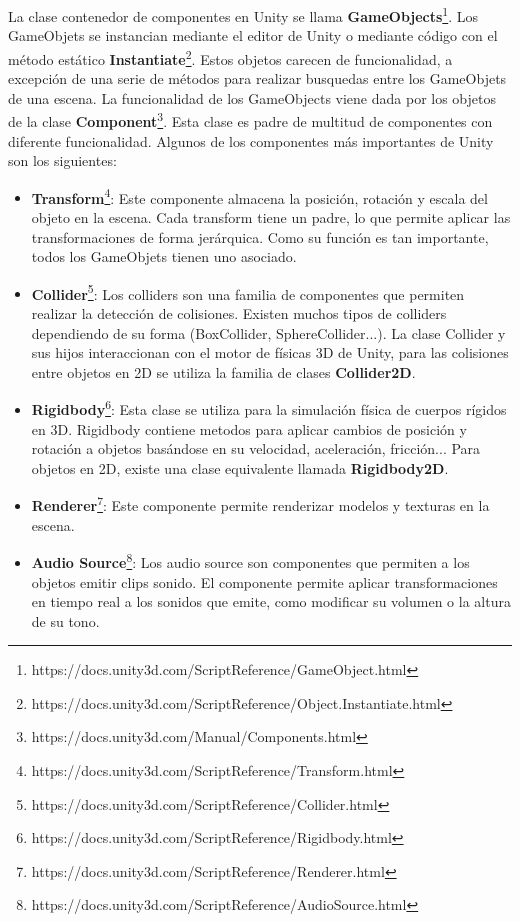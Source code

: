 La clase contenedor de componentes en Unity se llama \textbf{GameObjects}\footnote{https://docs.unity3d.com/ScriptReference/GameObject.html}. Los GameObjets se instancian mediante el editor de Unity o mediante código con el método estático \textbf{Instantiate}\footnote{https://docs.unity3d.com/ScriptReference/Object.Instantiate.html}. Estos objetos carecen de funcionalidad, a excepción de una serie de métodos para realizar busquedas entre los GameObjets de una escena. La funcionalidad de los GameObjects viene dada por los objetos de la clase \textbf{Component}\footnote{https://docs.unity3d.com/Manual/Components.html}. Esta clase es padre de multitud de componentes con diferente funcionalidad. Algunos de los componentes más importantes de Unity son los siguientes:
\begin{itemize}
\item \textbf{Transform}\footnote{https://docs.unity3d.com/ScriptReference/Transform.html}: Este componente almacena la posición, rotación y escala del objeto en la escena. Cada transform tiene un padre, lo que permite aplicar las transformaciones de forma jerárquica. Como su función es tan importante, todos los GameObjets tienen uno asociado.
\item \textbf{Collider}\footnote{https://docs.unity3d.com/ScriptReference/Collider.html}: Los colliders son una familia de componentes que permiten realizar la detección de colisiones. Existen muchos tipos de colliders dependiendo de su forma (BoxCollider, SphereCollider...). La clase Collider y sus hijos interaccionan con el motor de físicas 3D de Unity, para las colisiones entre objetos en 2D se utiliza la familia de clases \textbf{Collider2D}.
\item \textbf{Rigidbody}\footnote{https://docs.unity3d.com/ScriptReference/Rigidbody.html}: Esta clase se utiliza para la simulación física de cuerpos rígidos en 3D. Rigidbody contiene metodos para aplicar cambios de posición y rotación a objetos basándose en su velocidad, aceleración, fricción... Para objetos en 2D, existe una clase equivalente llamada \textbf{Rigidbody2D}.
\item \textbf{Renderer}\footnote{https://docs.unity3d.com/ScriptReference/Renderer.html}: Este componente permite renderizar modelos y texturas en la escena. 
\item \textbf{Audio Source}\footnote{https://docs.unity3d.com/ScriptReference/AudioSource.html}: Los audio source son componentes que permiten a los objetos emitir clips sonido. El componente permite aplicar transformaciones en tiempo real a los sonidos que emite, como modificar su volumen o la altura de su tono.

\end{itemize}
